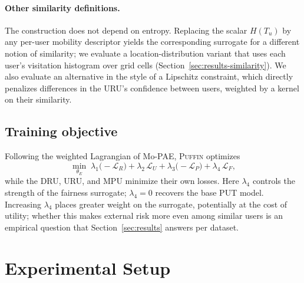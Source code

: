 \documentclass[sigconf,anonymous,review]{acmart}
\newcommand{\puffin}{\textsc{Puffin}}
\begin{document}
\paragraph{Other similarity definitions.} The construction does not depend on entropy. Replacing the scalar $H(T_u)$ by any per-user mobility descriptor yields the corresponding surrogate for a different notion of similarity; we evaluate a location-distribution variant that uses each user's visitation histogram over grid cells (Section~\ref{sec:results-similarity}). We also evaluate an alternative in the style of a Lipschitz constraint, which directly penalizes differences in the URU's confidence between users, weighted by a kernel on their similarity.

\subsection{Training objective}
Following the weighted Lagrangian of Mo-PAE, \puffin{} optimizes
\begin{equation}
\min_{\theta_E} \; \lambda_1\big(-\mathcal{L}_R\big) + \lambda_2\,\mathcal{L}_U + \lambda_3\big(-\mathcal{L}_P\big) + \lambda_4\,\mathcal{L}_F ,
\end{equation}
while the DRU, URU, and MPU minimize their own losses. Here $\lambda_4$ controls the strength of the fairness surrogate; $\lambda_4=0$ recovers the base PUT model. Increasing $\lambda_4$ places greater weight on the surrogate, potentially at the cost of utility; whether this makes external risk more even among similar users is an empirical question that Section~\ref{sec:results} answers per dataset.

\section{Experimental Setup}
\label{sec:setup}
\end{document}

